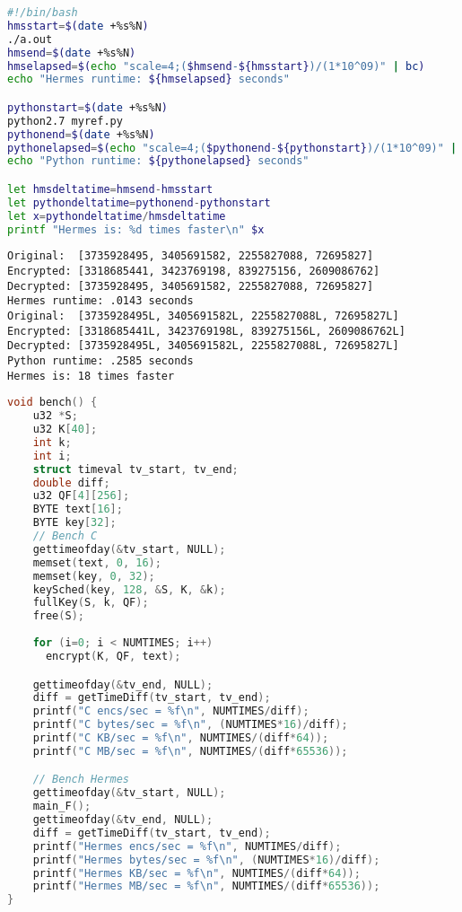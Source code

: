 \begin{lstlisting}[label=listing:python_experiment, caption=The Python experiment calculates the time elapsed for the generated Hermes code and the Python code., language=bash, float=tp]
#!/bin/bash
hmsstart=$(date +%s%N)
./a.out
hmsend=$(date +%s%N)
hmselapsed=$(echo "scale=4;($hmsend-${hmsstart})/(1*10^09)" | bc)
echo "Hermes runtime: ${hmselapsed} seconds"

pythonstart=$(date +%s%N)
python2.7 myref.py
pythonend=$(date +%s%N)
pythonelapsed=$(echo "scale=4;($pythonend-${pythonstart})/(1*10^09)" | bc)
echo "Python runtime: ${pythonelapsed} seconds"

let hmsdeltatime=hmsend-hmsstart
let pythondeltatime=pythonend-pythonstart
let x=pythondeltatime/hmsdeltatime
printf "Hermes is: %d times faster\n" $x
\end{lstlisting}
\begin{lstlisting}[label=listing:python_experiment_result, caption=The result of the Python experiment contains print statements of the original data\, the encrypted data and the decrypted data\, which is equal to the original data., float=tp]
Original:  [3735928495, 3405691582, 2255827088, 72695827]
Encrypted: [3318685441, 3423769198, 839275156, 2609086762]
Decrypted: [3735928495, 3405691582, 2255827088, 72695827]
Hermes runtime: .0143 seconds
Original:  [3735928495L, 3405691582L, 2255827088L, 72695827L]
Encrypted: [3318685441L, 3423769198L, 839275156L, 2609086762L]
Decrypted: [3735928495L, 3405691582L, 2255827088L, 72695827L]
Python runtime: .2585 seconds
Hermes is: 18 times faster
\end{lstlisting} 
\begin{lstlisting}[label=listing:bench_C, caption=The C experiment calculates the time elapsed for the generated Hermes code and the highly optimized C code., language=C, float=htp, numbersep=4pt]
void bench() {
    u32 *S;
    u32 K[40];
    int k;
    int i;
    struct timeval tv_start, tv_end;
    double diff;
    u32 QF[4][256];
    BYTE text[16];
    BYTE key[32];
    // Bench C
    gettimeofday(&tv_start, NULL);
    memset(text, 0, 16);
    memset(key, 0, 32);
    keySched(key, 128, &S, K, &k);
    fullKey(S, k, QF);
    free(S);
    
    for (i=0; i < NUMTIMES; i++)
      encrypt(K, QF, text);

    gettimeofday(&tv_end, NULL);
    diff = getTimeDiff(tv_start, tv_end);
    printf("C encs/sec = %f\n", NUMTIMES/diff);
    printf("C bytes/sec = %f\n", (NUMTIMES*16)/diff);
    printf("C KB/sec = %f\n", NUMTIMES/(diff*64));
    printf("C MB/sec = %f\n", NUMTIMES/(diff*65536));

    // Bench Hermes
    gettimeofday(&tv_start, NULL);
    main_F();
    gettimeofday(&tv_end, NULL);
    diff = getTimeDiff(tv_start, tv_end);
    printf("Hermes encs/sec = %f\n", NUMTIMES/diff);
    printf("Hermes bytes/sec = %f\n", (NUMTIMES*16)/diff);
    printf("Hermes KB/sec = %f\n", NUMTIMES/(diff*64));
    printf("Hermes MB/sec = %f\n", NUMTIMES/(diff*65536));
}
\end{lstlisting}
